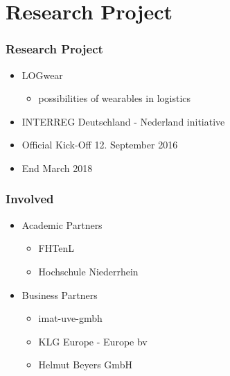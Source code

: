 \section{Research Project}
\begin{frame}\frametitle{Research Project}
	\begin{itemize}
		\item LOGwear
		\begin{itemize}
			\item possibilities of wearables in logistics
		\end{itemize}
		\item INTERREG Deutschland - Nederland initiative
		\item Official Kick-Off 12. September 2016
		\item End March 2018
	\end{itemize}
\end{frame}
\begin{frame}\frametitle{Involved}
\begin{itemize}

	\item Academic Partners
	\begin{itemize}
		\item FHTenL
		\item Hochschule Niederrhein
	\end{itemize}
	\item Business Partners
	\begin{itemize}
		\item imat-uve-gmbh
		\item KLG Europe - Europe bv %
		\item Helmut Beyers GmbH
	\end{itemize}
	\end{itemize}
\end{frame}